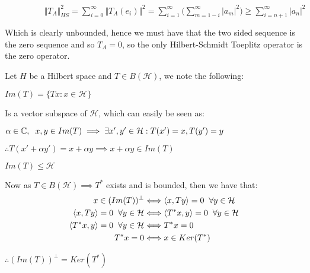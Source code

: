 \documentclass[10pt,a4paper]{article}
\begin{document}
$\hspace{2cm} {\Vert T_A \Vert}^2_{HS} = \sum\limits_{i=0}^{\infty}{\Vert T_A(e_i) \Vert}^2 = \sum\limits_{i=1}^{\infty}\bigl(\sum\limits_{m=1-i}^{\infty} |a_m|^2\bigr) \ge \sum\limits_{i=n+1}^{\infty}|a_n|^2$

Which is clearly unbounded, hence we must have that the two sided sequence is the zero sequence and so $T_A = 0$, so the only Hilbert-Schmidt Toeplitz operator is the zero operator.


Let $H$ be a Hilbert space and $ T \in B(\mathcal{H})$, we note the following:

\hspace{3cm}$Im(T) = \lbrace Tx : x \in \mathcal{H}\rbrace$

Is a vector subspace of $\mathcal{H}$, which can easily be seen as:

\hspace{1cm}$\alpha \in \mathbb{C}, \hspace{0.2cm} x,y \in Im(T) \implies \exists x', y' \in \mathcal{H} : T(x') = x, T(y') = y$ 

\hspace{2cm}$\therefore T(x' + \alpha y') = x+\alpha y \implies x+ \alpha y \in Im(T)$

\hspace{5cm}$ Im(T) \le \mathcal{H}$

Now as $T \in B(\mathcal{H}) \implies T^*$ exists and is bounded, then we have that:
\begin{align}
x \in (Im(T))^\perp &\Longleftrightarrow \langle x, Ty \rangle = 0 \hspace{0.2cm} \forall y \in \mathcal{H} \\
\langle x, Ty \rangle = 0 \hspace{0.2cm} \forall y \in \mathcal{H} &\Longleftrightarrow \langle T^*x , y \rangle = 0 \hspace{0.2cm} \forall y \in \mathcal{H} \\ 
\langle T^*x , y \rangle = 0 \hspace{0.2cm} \forall y \in \mathcal{H}&\Longleftrightarrow T^*x = 0 \\
T^*x = 0 &\Longleftrightarrow x \in Ker(T^*)
\end{align}

\hspace{4cm} $\therefore (Im(T))^\perp = Ker(T^*)$
\end{document}
